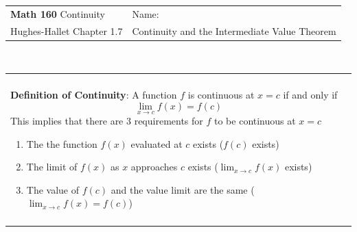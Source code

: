 \documentclass[12pt]{report}
\newenvironment{boxe}
    {\begin{center}
    \begin{tabular}{|p{0.9\textwidth}|}
    \hline\\
    }
    { 
    \\\\\hline
    \end{tabular} 
    \end{center}
    }
\begin{document}
\begin{tabular*}{\textwidth}{@{\extracolsep{\fill}}ll}
\textbf{Math 160} Continuity & \;\;Name: \hrulefill \\
 Hughes-Hallet Chapter 1.7& Continuity and the Intermediate Value Theorem\hspace{1in}  \\
\hline\hline
\end{tabular*} \\






 \begin{boxe}
\textbf{Definition of Continuity}: A function $f$ is continuous at $x=c$ if and only if 
$$\lim_{x\rightarrow c}f(x)=f(c)$$
This implies that there are $3$ requirements for $f$ to be continuous at $x=c$
\begin{enumerate}
    \item The the function $f(x)$ evaluated at $c$ exists ($f(c)$ exists)
    \item The limit of $f(x)$ as $x$ approaches $c$ exists ($\lim_{x\rightarrow c}f(x)$ exists)
    \item The value of $f(c)$ and the value limit are the same ($\lim_{x\rightarrow c}f(x)=f(c)$)
\end{enumerate}
\end{boxe}
\end{document}
